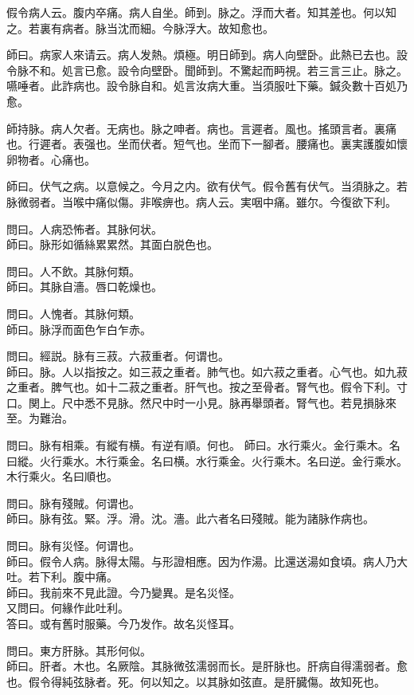 \documentclass[12pt,twoside,UTF8,b5paper]{ctexbook}
\begin{document}
假令病人云。腹内卒痛。病人自坐。師到。脉之。浮而大者。知其差也。何以知之。若裏有病者。脉当沈而細。今脉浮大。故知愈也。

師曰。病家人來请云。病人发熱。煩極。明日師到。病人向壁卧。此熱已去也。設令脉不和。処言已愈。設令向壁卧。聞師到。不驚起而眄視。若三言三止。脉之。嚥唾者。此詐病也。設令脉自和。処言汝病大重。当須服吐下藥。鍼灸數十百処乃愈。

師持脉。病人欠者。无病也。脉之呻者。病也。言遲者。風也。搖頭言者。裏痛也。行遲者。表强也。坐而伏者。短气也。坐而下一腳者。腰痛也。裏実護腹如懷卵物者。心痛也。

師曰。伏气之病。以意候之。今月之内。欲有伏气。假令舊有伏气。当須脉之。若脉微弱者。当喉中痛似傷。非喉痹也。病人云。実咽中痛。雖尔。今復欲下利。

問曰。人病恐怖者。其脉何状。\\
師曰。脉形如循絲累累然。其面白脱色也。

問曰。人不飲。其脉何類。\\
師曰。其脉自濇。唇口乾燥也。

問曰。人愧者。其脉何類。\\
師曰。脉浮而面色乍白乍赤。

問曰。經説。脉有三菽。六菽重者。何谓也。\\
師曰。脉。人以指按之。如三菽之重者。肺气也。如六菽之重者。心气也。如九菽之重者。脾气也。如十二菽之重者。肝气也。按之至骨者。腎气也。假令下利。寸口。関上。尺中悉不見脉。然尺中时一小見。脉再舉頭者。腎气也。若見損脉來至。为難治。

問曰。脉有相乘。有縱有横。有逆有順。何也。
師曰。水行乘火。金行乘木。名曰縱。火行乘水。木行乘金。名曰横。水行乘金。火行乘木。名曰逆。金行乘水。木行乘火。名曰順也。

問曰。脉有殘賊。何谓也。\\
師曰。脉有弦。緊。浮。滑。沈。濇。此六者名曰殘賊。能为諸脉作病也。

問曰。脉有災怪。何谓也。\\
師曰。假令人病。脉得太陽。与形證相應。因为作湯。比還送湯如食頃。病人乃大吐。若下利。腹中痛。\\
師曰。我前來不見此證。今乃變異。是名災怪。\\
又問曰。何緣作此吐利。\\
答曰。或有舊时服藥。今乃发作。故名災怪耳。

問曰。東方肝脉。其形何似。\\
師曰。肝者。木也。名厥陰。其脉微弦濡弱而长。是肝脉也。肝病自得濡弱者。愈也。假令得純弦脉者。死。何以知之。以其脉如弦直。是肝臓傷。故知死也。
\end{document}
